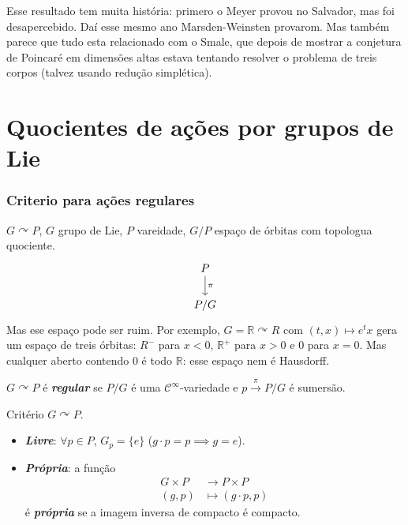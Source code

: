 \begin{remark}\leavevmode
	Esse resultado tem muita história: primero o Meyer provou no Salvador, mas foi desapercebido. Daí esse mesmo ano Marsden-Weinsten provarom. Mas também parece que tudo esta relacionado com o Smale, que depois de mostrar a conjetura de Poincaré em dimensões altas estava tentando resolver o problema de treis corpos (talvez usando redução simplética).
\end{remark}

\section{Quocientes de ações por grupos de Lie}

\subsubsection{Criterio para ações regulares}

$G \curvearrowright P$, $G$ grupo de Lie, $P$ vareidade, $G/P$ espaço de órbitas com topologua quociente.
\[\begin{tikzcd}
P\arrow[d,"\pi"]\\
P/G
\end{tikzcd}\]
Mas ese espaço pode ser ruim. Por exemplo, $G=\mathbb{R}\curvearrowright R$ com $(t,x)\mapsto e^tx$ gera um espaço de treis órbitas: $R^-$ para $x<0$,  $\mathbb{R}^+$ para $x>0$ e  $0$ para  $x=0$. Mas cualquer aberto contendo  $0$  é todo $\mathbb{R}$: esse espaço nem é Hausdorff.

\begin{defn}\leavevmode
	$G \curvearrowright P$ é \textit{\textbf{regular}} se  $P/G$  é uma $\mathcal{C}^\infty$-variedade e $p\overset{\pi}{\longrightarrow}P/G$ é sumersão.
\end{defn}

\begin{idea2}{Critério}\leavevmode
	$G \curvearrowright P$.
	\begin{itemize}
	\item \textit{\textbf{Livre}}: $\forall  p \in P$, $G_p=\{e\}$ ($g\cdot p=p \implies g=e$).
	\item \textit{\textbf{Própria}}: a função
		\begin{align*}
			G\times P &\longrightarrow P\times P \\
			(g,p) &\longmapsto (g\cdot p,p)
		\end{align*}
		é \textit{\textbf{própria}} se a imagem inversa de compacto é compacto.
	\end{itemize}
\end{idea2}


